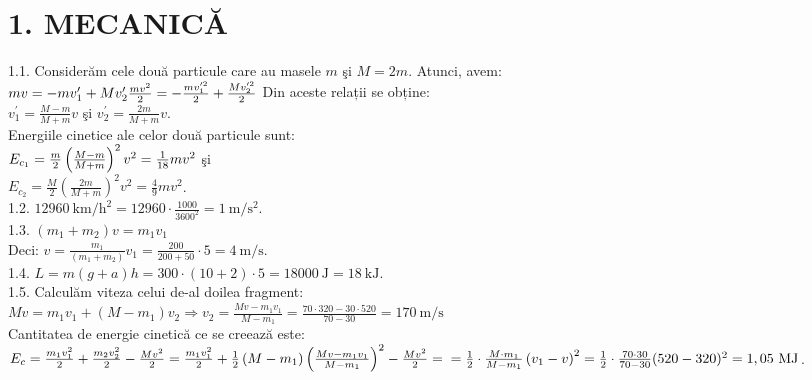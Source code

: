 
\section*{1. MECANICĂ}

1.1. Considerăm cele două particule care au masele $m$ şi $M=2 m$. Atunci, avem:\\ $ m v=-m v_{1}^{\prime}+M v_{2}^{\prime}\\ \frac{m v^{2}}{2}=-\frac{m v_{1}^{\prime 2}}{2}+\frac{M v_{2}^{\prime 2}}{2}\\$ Din aceste relații se obține:\\ $v_{1}^{\prime}=\frac{M-m}{M+m} v$ şi $v_{2}^{\prime}=\frac{2 m}{M+m} v$.\\ Energiile cinetice ale celor două particule sunt:\\ $E_{c_{1}}=\frac{m}{2}\left(\frac{M-m}{M+m}\right)^{2} v^{2}=\frac{1}{18} m v^{2}\\$ şi\\ $E_{c_{2}}=\frac{M}{2}\left(\frac{2 m}{M+m}\right)^{2} v^{2}=\frac{4}{9} m v^{2}$.\\

1.2. $12960 \mathrm{~km} / \mathrm{h}^{2}=12960 \cdot \frac{1000}{3600^{2}}=1 \mathrm{~m} / \mathrm{s}^{2}$.\\

1.3. $\left(m_{1}+m_{2}\right) v=m_{1} v_{1}$\\ Deci: $v=\frac{m_{1}}{\left(m_{1}+m_{2}\right)} v_{1}=\frac{200}{200+50} \cdot 5=4 \mathrm{~m} / \mathrm{s}$.\\

1.4. $L=m(g+a) h=300 \cdot (10+2) \cdot 5=18000 \mathrm{~J}=18 \mathrm{~kJ}$.\\

1.5. Calculăm viteza celui de-al doilea fragment:\\ $M v=m_{1} v_{1}+\left(M-m_{1}\right) v_{2} \Rightarrow v_{2}=\frac{M v-m_{1} v_{1}}{M-m_{1}}=\frac{70 \cdot 320-30 \cdot 520}{70-30}=170 \mathrm{~m} / \mathrm{s}$\\ Cantitatea de energie cinetică ce se creează este:\\ $E_{c} =\frac{m_{1} v_{1}^{2}}{2}+\frac{m_{2} v_{2}^{2}}{2}-\frac{M v^{2}}{2}=\frac{m_{1} v_{1}^{2}}{2}+\frac{1}{2}\left(M-m_{1}\right)\left(\frac{M v-m_{1} v_{1}}{M-m_{1}}\right)^{2}-\frac{M v^{2}}{2}= \\ =\frac{1}{2} \cdot \frac{M \cdot m_{1}}{M-m_{1}}\left(v_{1}-v\right)^{2}=\frac{1}{2} \cdot \frac{70 \cdot 30}{70-30}(520-320)^{2}=1,05 \mathrm{~MJ}$.\\

